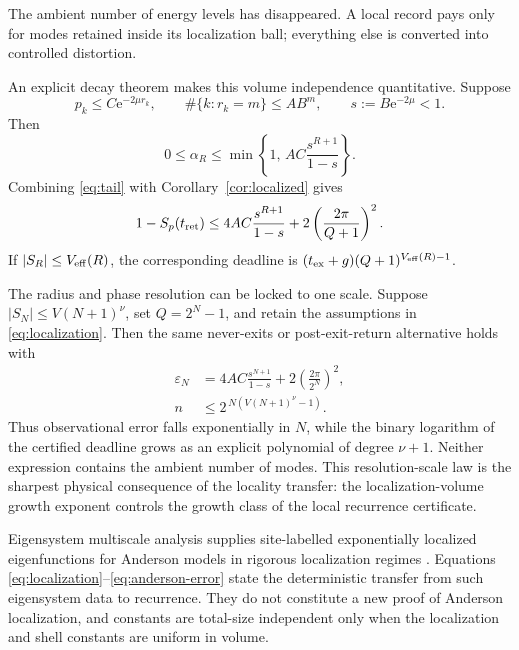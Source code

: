 \documentclass[10pt]{article}
\theoremstyle{definition}
\newcommand{\ee}{\mathrm e}
\begin{document}
The ambient number of energy levels has disappeared. A local record pays
only for modes retained inside its localization ball; everything else is
converted into controlled distortion.

An explicit decay theorem makes this volume independence quantitative.
Suppose
\begin{equation}
 p_k\le C\ee^{-2\mu r_k},\qquad
 \#\{k:r_k=m\}\le AB^m,\qquad
 s:=B\ee^{-2\mu}<1.
 \label{eq:localization}
\end{equation}
Then
\begin{equation}
 0\le\alpha_R\le
 \min\left\{1,\,
 AC\frac{s^{R+1}}{1-s}\right\}.
 \label{eq:tail}
\end{equation}
Combining \eqref{eq:tail} with Corollary~\ref{cor:localized} gives
\begin{equation}
 1-S_p(t_{\rm ret})\le
 4AC\frac{s^{R+1}}{1-s}
  +2\left(\frac{2\pi}{Q+1}\right)^2.
 \label{eq:anderson-error}
\end{equation}
If \(|S_R|\le V_{\rm eff}(R)\), the corresponding deadline is
\((t_{\rm ex}+g)(Q+1)^{V_{\rm eff}(R)-1}\).

The radius and phase resolution can be locked to one scale. Suppose
\(|S_N|\le V(N+1)^\nu\), set \(Q=2^N-1\), and retain the assumptions in
\eqref{eq:localization}. Then the same never-exits or post-exit-return
alternative holds with
\begin{align}
 \varepsilon_N&=
 4AC\frac{s^{N+1}}{1-s}
 +2\left(\frac{2\pi}{2^N}\right)^2,
 \label{eq:scale-error}\\
 n&\le
 2^{\,N\left(V(N+1)^\nu-1\right)}.
 \label{eq:scale-deadline}
\end{align}
Thus observational error falls exponentially in \(N\), while the binary
logarithm of the certified deadline grows as an explicit polynomial of
degree \(\nu+1\). Neither expression contains the ambient number of modes.
This resolution-scale law is the sharpest physical consequence of the
locality transfer: the localization-volume growth exponent controls the
growth class of the local recurrence certificate.

Eigensystem multiscale analysis supplies site-labelled exponentially
localized eigenfunctions for Anderson models in rigorous localization
regimes \cite{ElgartKlein2016,ElgartKlein2018}. Equations
\eqref{eq:localization}--\eqref{eq:anderson-error} state the deterministic
transfer from such eigensystem data to recurrence. They do not constitute a
new proof of Anderson localization, and constants are total-size
independent only when the localization and shell constants are uniform in
volume.
\end{document}
